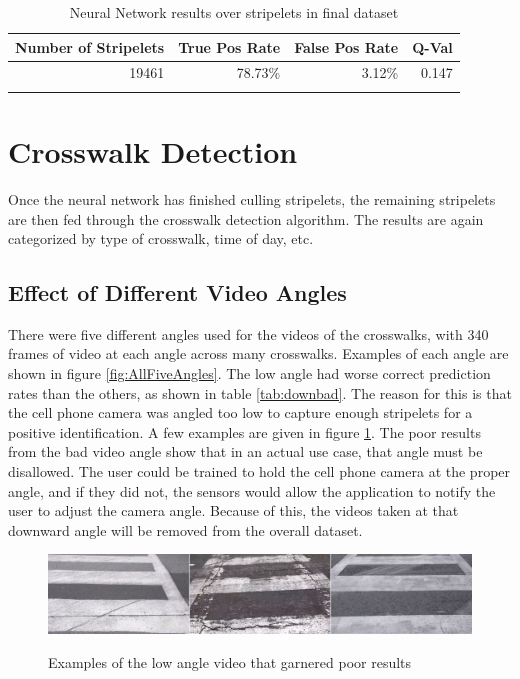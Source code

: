 \documentclass[12pt]{ucthesis}
\newcommand{\captionfonts}{\small\bf\ssp}
\begin{document}
    \begin{table}[t]
        \begin{longtable}{|r|r|r|r|}
        \hline
        Number of Stripelets & True Pos Rate & False Pos Rate & Q-Val \bigstrut\\
        \hline
        19461 & 78.73\% & 3.12\% & 0.147 \bigstrut\\
        \hline
    
        \caption{Neural Network results over stripelets in final dataset}
        \label{tab:nnresultsoverall} 
        \end{longtable}
    \end{table}

\clearpage





\section{Crosswalk Detection}
Once the neural network has finished culling stripelets, the remaining stripelets are then fed through the crosswalk detection algorithm. The results are again categorized by type of crosswalk, time of day, etc. 

\subsection{Effect of Different Video Angles}

There were five different angles used for the videos of the crosswalks, with 340 frames of video at each angle across many crosswalks. Examples of each angle are shown in figure \ref{fig:AllFiveAngles}. The low angle had worse correct prediction rates than the others, as shown in table \ref{tab:downbad}. The reason for this is that the cell phone camera was angled too low to capture enough stripelets for a positive identification. A few examples are given in figure \ref{fig:downBadPic}. The poor results from the bad video angle show that in an actual use case, that angle must be disallowed. The user could be trained to hold the cell phone camera at the proper angle, and if they did not, the sensors would allow the application to notify the user to adjust the camera angle. Because of this, the videos taken at that downward angle will be removed from the overall dataset. 

\begin{figure}[t]
\begin{center}
\includegraphics[width=15cm]{DownBad.png}
\captionfonts
\caption[Low Angle Video Examples]{Examples of the low angle video that garnered poor results}
\label{fig:downBadPic}
\end{center}
\end{figure}
\end{document}
